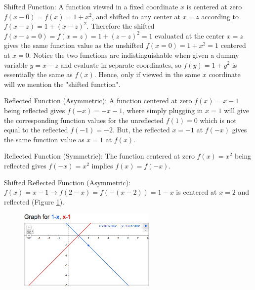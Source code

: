 \begin{exmp} 
    Shifted Function: A function viewed in a fixed coordinate $x$ is centered at zero $f(x-0)=f(x)=1+x^2$, 
    and shifted to any center at $x=z$ according to $f(x-z)=1+(x-z)^2$. 
    Therefore the shifted $f(x-z=0)=f(x=z)=1+(z-z)^2=1$ evaluated at the center $x=z$ gives the same function value as the unshifted $f(x=0)=1+x^2=1$ centered at $x=0$.
    Notice the two functions are indistinguishable when given a dummy variable $y=x-z$ and evaluate in separate coordinates, so $f(y)=1+y^2$ is essentially the same as $f(x)$.
    Hence, only if viewed in the same $x$ coordinate will we mention the "shifted function".
\end{exmp}

\begin{exmp} \label{exmp:reflect_func_asym}
    Reflected Function (Asymmetric): A function centered at zero $f(x)=x-1$ being reflected gives $f(-x)=-x-1$, where simply plugging in 
    $x=1$ will give the corresponding function values for the unreflected $f(1)=0$ which is not equal to the reflected $f(-1)=-2$.
    But, the reflected $x=-1$ at $f(-x)$ gives the same function value as $x=1$ at $f(x)$.
\end{exmp}

\begin{exmp}
    Reflected Function (Symmetric): The function centered at zero $f(x)=x^2$ being reflected gives $f(-x)=x^2$ implies $f(x)=f(-x)$.
\end{exmp}

\begin{exmp} \label{exmp:shift_reflect_func_asym}
    Shifted Reflected Function (Asymmetric): $f(x)=x-1 \rightarrow f(2-x)=f(-(x-2))=1-x$ is centered at $x=2$ and reflected (Figure \ref{fig:shift_reflect_func_asym}).
    \begin{figure} [H]
        \includegraphics[width=0.6\textwidth]{shift_reflect_func_asym.png}
        \caption{}
        \label{fig:shift_reflect_func_asym}
    \end{figure}
\end{exmp}

